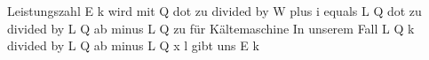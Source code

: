 Leistungszahl E k wird mit Q dot zu divided by W plus i equals L Q dot zu divided by L Q ab minus L Q zu  
für Kältemaschine  
In unserem Fall  
L Q k divided by L Q ab minus L Q x l gibt uns E k